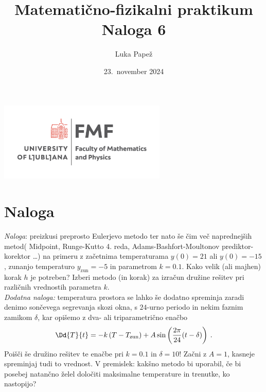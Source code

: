 \documentclass{article}
\begin{document}
\title{Matematično-fizikalni praktikum \\[3mm] \large Naloga 6}
\author{Luka Papež}
\date{23.\ november 2024}

\begin{center}
    \includegraphics[width=8cm]{logo-fmf.png}
\end{center}

{
    \let\newpage\relax
    \maketitle
}

\maketitle
\newpage
\section{Naloga}

{\it Naloga\/}: preizkusi preprosto Eulerjevo metodo ter nato še čim več 
naprednejših metod( Midpoint, Runge-Kutto 4. reda, Adams-Bashfort-Moultonov prediktor-korektor \ldots ) na primeru
z začetnima temperaturama $y(0)=21$ ali $y(0)=-15$,
zunanjo temperaturo $y_\mathrm{zun}=-5$ in parametrom $k=0.1$.
Kako velik (ali majhen) korak $h$ je potreben?
Izberi metodo (in korak) za izračun družine rešitev
pri različnih vrednostih parametra $k$.
\\
{\it Dodatna naloga\/:} temperatura prostora se lahko še
dodatno spreminja zaradi denimo sončevega segrevanja
skozi okna, s $24$-urno periodo in nekim faznim zamikom $\delta$,
kar opišemo z dva- ali triparametrično enačbo
\begin{equation}
\Dd{T}{t} = - k \left( T-T_\mathrm{zun} \right)
+ A\sin\left( {2\pi\over 24}(t-\delta) \right) \>.
\label{cooling2}
\end{equation}
Poišči še družino rešitev te enačbe pri
$k=0.1$ in $\delta=10$!  Začni z $A=1$, kasneje spreminjaj tudi
to vrednost.  V premislek: kakšno metodo bi uporabil, če bi posebej
natančno želel določiti maksimalne temperature in trenutke,
ko nastopijo?
\end{document}
